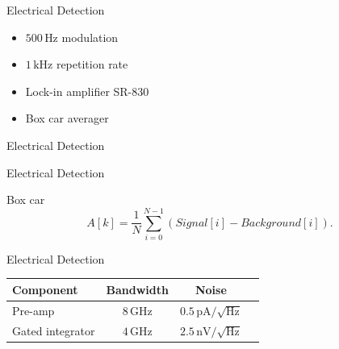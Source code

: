 \documentclass[aspectratio=169, 10pt]{beamer}
\begin{document}
\begin{frame}{Electrical Detection}
  \begin{minipage}{0.33\textwidth}
    \begin{itemize}
      \item $500\,\unit{\hertz}$ modulation
      \item $1\,\unit{\kilo\hertz}$ repetition rate 
      \item Lock-in amplifier SR-830
      \item Box car averager
    \end{itemize}
  \end{minipage} \hfill
  \begin{minipage}{0.66\textwidth}
    \centering
    \resizebox{\textwidth}{!}{}
    \resizebox{\textwidth}{!}{}
  \end{minipage}
\end{frame}


\begin{frame}{Electrical Detection}
  \centering
  \resizebox{0.8\textwidth}{!}{}
\end{frame}


\begin{frame}{Electrical Detection}
  \begin{block}{Box car}
    \begin{equation}
      A[k]=\frac{1}{N}\sum_{i=0}^{N-1}\left(Signal\left[i\right]-Background\left[i\right]\right).
    \end{equation}
  \end{block}
  \centering
  \resizebox{0.9\textwidth}{!}{}
\end{frame}


\begin{frame}{Electrical Detection}
  \centering
  \resizebox{\textwidth}{!}{}
  \vspace{5mm}
  \small
  \begin{tabular}{l S[table-format=2.2] S[table-format=1.3] S[table-format=3.1]}
    \toprule
    \textbf{Component} & {\textbf{Bandwidth}} & {\textbf{Noise}} \\
    \midrule
    Pre-amp              & {$8\,\unit{\giga\hertz}$}                    & {$0.5\,\unit{\pico\ampere}/\sqrt{\unit{\hertz}}$}          \\
    Gated integrator     & {$4\,\unit{\giga\hertz}$}                    & {$2.5\,\unit{\nano\volt}/\sqrt{\unit{\hertz}}$}          \\
    \bottomrule
  \end{tabular}
\end{frame}
\end{document}
